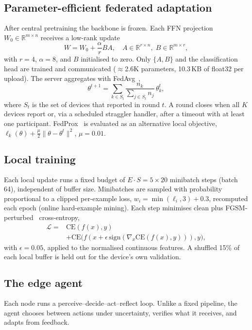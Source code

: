 \documentclass[conference]{IEEEtran}
\begin{document}
\subsection{Parameter-efficient federated adaptation}
After central pretraining the backbone is frozen. Each FFN projection
$W_0\in\mathbb R^{m\times n}$ receives a low-rank update
\begin{equation}
W = W_0 + \frac{\alpha}{r} B A,\quad A\in\mathbb R^{r\times n},\; B\in\mathbb R^{m\times r},
\end{equation}
with $r{=}4$, $\alpha{=}8$, and $B$ initialised to zero. Only $\{A,B\}$ and
the classification head are trained and communicated
($\approx$2.6K parameters, 10.3\,KB of float32 per upload).
The server aggregates with FedAvg~\cite{mcmahan2017},
\begin{equation}
\theta^{t+1} = \sum_{k\in S_t} \frac{n_k}{\sum_{j\in S_t} n_j}\,\theta_k^{t},
\end{equation}
where $S_t$ is the set of devices that reported in round $t$. A round closes
when all $K$ devices report or, via a scheduled straggler handler, after a
timeout with at least one participant. FedProx~\cite{li2020fedprox} is evaluated as an
alternative local objective,
$\ell_k(\theta) + \frac{\mu}{2}\lVert\theta-\theta^{t}\rVert^2$, $\mu{=}0.01$.

\subsection{Local training}
Each local update runs a fixed budget of $E{\cdot}S = 5{\times}20$ minibatch
steps (batch 64), independent of buffer size. Minibatches are sampled with
probability proportional to a clipped per-example loss,
$w_i = \min(\ell_i, 3) + 0.3$, recomputed each epoch (online hard-example
mining). Each step minimises clean plus FGSM-perturbed~\cite{goodfellow2015}
cross-entropy,
\begin{equation}
\begin{aligned}
\mathcal L ={}& \mathrm{CE}(f(x),y)\\
&+ \mathrm{CE}\big(f(x+\epsilon\,\mathrm{sign}(\nabla_x \mathrm{CE}(f(x),y))),y\big),
\end{aligned}
\end{equation}
with $\epsilon{=}0.05$, applied to the normalised continuous features. A shuffled 15\% of each
local buffer is held out for the device's own validation.

\subsection{The edge agent}
Each node runs a perceive--decide--act--reflect loop. Unlike a fixed pipeline,
the agent chooses between actions under uncertainty, verifies what it
receives, and adapts from feedback.
\end{document}
